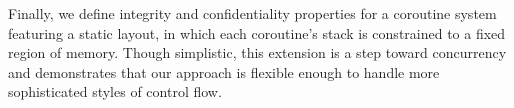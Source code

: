 \documentclass[acmsmall,review,anonymous]{acmart}\settopmatter{printfolios=true,printccs=false,printacmref=false}
\begin{document}
Finally, we define integrity and confidentiality properties for a coroutine system featuring
a static layout, in which each coroutine's stack is constrained to a fixed region of memory.
Though simplistic, this extension is a step toward concurrency and demonstrates that
our approach is flexible enough to handle more sophisticated styles of
control flow.





\end{document}

